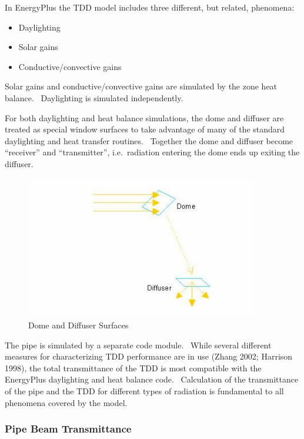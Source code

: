 In EnergyPlus the TDD model includes three different, but related, phenomena:

\begin{itemize}
\item
  Daylighting
\item
  Solar gains
\item
  Conductive/convective gains
\end{itemize}

Solar gains and conductive/convective gains are simulated by the zone heat balance.~ Daylighting is simulated independently.

For both daylighting and heat balance simulations, the dome and diffuser are treated as special window surfaces to take advantage of many of the standard daylighting and heat transfer routines.~ Together the dome and diffuser become ``receiver'' and ``transmitter'', i.e.~radiation entering the dome ends up exiting the diffuser.

\begin{figure}[hbtp] %
\centering
\includegraphics[width=0.9\textwidth, height=0.9\textheight, keepaspectratio=true]{media/image870.png}
\caption{  Dome and Diffuser Surfaces \protect \label{fig:dome-and-diffuser-surfaces}}
\end{figure}

The pipe is simulated by a separate code module.~ While several different measures for characterizing TDD performance are in use (Zhang 2002; Harrison 1998), the total transmittance of the TDD is most compatible with the EnergyPlus daylighting and heat balance code.~ Calculation of the transmittance of the pipe and the TDD for different types of radiation is fundamental to all phenomena covered by the model.

\subsubsection{Pipe Beam Transmittance}\label{pipe-beam-transmittance}


